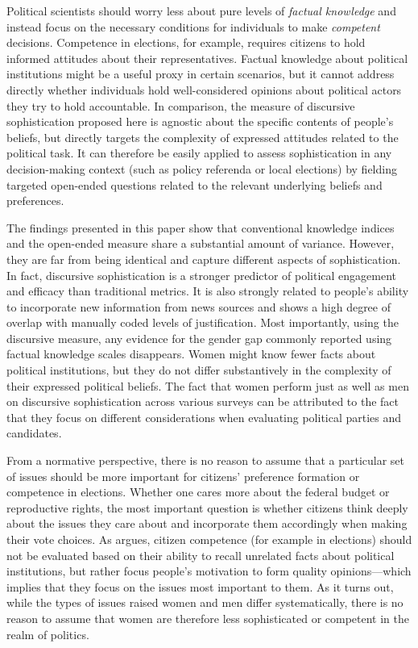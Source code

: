 Political scientists should worry less about pure levels of \textit{factual knowledge} and instead focus on the necessary conditions for individuals to make \textit{competent} decisions. Competence in elections, for example, requires citizens to hold informed attitudes about their representatives. Factual knowledge about political institutions might be a useful proxy in certain scenarios, but it cannot address directly whether individuals hold well-considered opinions about political actors they try to hold accountable. In comparison, the measure of discursive sophistication proposed here is agnostic about the specific contents of people's beliefs, but directly targets the complexity of expressed attitudes related to the political task. It can therefore be easily applied to assess sophistication in any decision-making context (such as policy referenda or local elections) by fielding targeted open-ended questions related to the relevant underlying beliefs and preferences.

The findings presented in this paper show that conventional knowledge indices and the open-ended measure share a substantial amount of variance. However, they are far from being identical and capture different aspects of sophistication. In fact, discursive sophistication is a stronger predictor of political engagement and efficacy than traditional metrics. It is also strongly related to people's ability to incorporate new information from news sources and shows a high degree of overlap with manually coded levels of justification. Most importantly, using the discursive measure, any evidence for the gender gap commonly reported using factual knowledge scales disappears. Women might know fewer facts about political institutions, but they do not differ substantively in the complexity of their expressed political beliefs. The fact that women perform just as well as men on discursive sophistication across various surveys can be attributed to the fact that they focus on different considerations when evaluating political parties and candidates.

From a normative perspective, there is no reason to assume that a particular set of issues should be more important for citizens' preference formation or competence in elections. Whether one cares more about the federal budget or reproductive rights, the most important question is whether citizens think deeply about the issues they care about and incorporate them accordingly when making their vote choices. As \citet{druckman2014pathologies} argues, citizen competence (for example in elections) should not be evaluated based on their ability to recall unrelated facts about political institutions, but rather focus people's motivation to form quality opinions---which implies that they focus on the issues most important to them. As it turns out, while the types of issues raised women and men differ systematically, there is no reason to assume that women are therefore less sophisticated or competent in the realm of politics.


